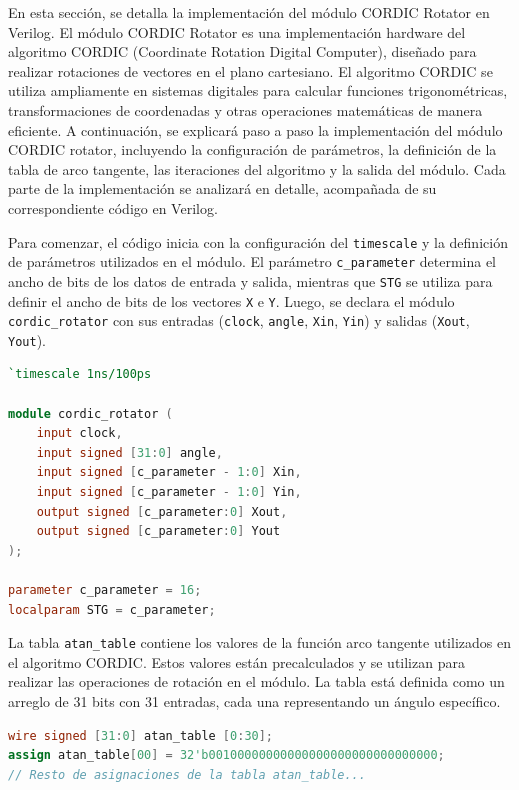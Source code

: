 \documentclass[12pt,a4paper, twoside]{article} %
\begin{document}
En esta sección, se detalla la implementación del módulo CORDIC Rotator en Verilog. El módulo CORDIC Rotator es una implementación hardware del algoritmo CORDIC (Coordinate Rotation Digital Computer), diseñado para realizar rotaciones de vectores en el plano cartesiano. El algoritmo CORDIC se utiliza ampliamente en sistemas digitales para calcular funciones trigonométricas, transformaciones de coordenadas y otras operaciones matemáticas de manera eficiente. A continuación, se explicará paso a paso la implementación del módulo CORDIC rotator, incluyendo la configuración de parámetros, la definición de la tabla de arco tangente, las iteraciones del algoritmo y la salida del módulo. Cada parte de la implementación se analizará en detalle, acompañada de su correspondiente código en Verilog.

Para comenzar, el código inicia con la configuración del \texttt{timescale} y la definición de parámetros utilizados en el módulo. El parámetro \texttt{c\_parameter} determina el ancho de bits de los datos de entrada y salida, mientras que \texttt{STG} se utiliza para definir el ancho de bits de los vectores \texttt{X} e \texttt{Y}. Luego, se declara el módulo \texttt{cordic\_rotator} con sus entradas (\texttt{clock}, \texttt{angle}, \texttt{Xin}, \texttt{Yin}) y salidas (\texttt{Xout}, \texttt{Yout}).

\begin{lstlisting}[language=Verilog]
`timescale 1ns/100ps

module cordic_rotator (
    input clock,
    input signed [31:0] angle,
    input signed [c_parameter - 1:0] Xin,
    input signed [c_parameter - 1:0] Yin,
    output signed [c_parameter:0] Xout,
    output signed [c_parameter:0] Yout
);

parameter c_parameter = 16;
localparam STG = c_parameter;
\end{lstlisting}

La tabla \texttt{atan\_table} contiene los valores de la función arco tangente utilizados en el algoritmo CORDIC. Estos valores están precalculados y se utilizan para realizar las operaciones de rotación en el módulo. La tabla está definida como un arreglo de 31 bits con 31 entradas, cada una representando un ángulo específico.

\begin{lstlisting}[language=Verilog]
wire signed [31:0] atan_table [0:30];
assign atan_table[00] = 32'b00100000000000000000000000000000; 
// Resto de asignaciones de la tabla atan_table...
\end{lstlisting}
\end{document}
